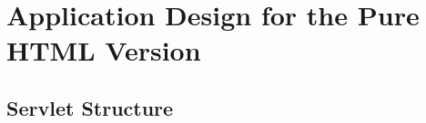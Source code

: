 \documentclass[12pt, a4paper, renqo, final]{amsart}
\let\stdsection\section
\renewcommand{\section}{\newpage\stdsection}
\begin{document}
		\section[PureHTML - Application Design]{Application Design for the Pure HTML Version}
			\subsection{Servlet Structure}
			\phantom{.}\\
				\noindent {}
			\phantom{.}
				\noindent {}
			\newpage
			\phantom{.}
				\noindent {}
\end{document}
